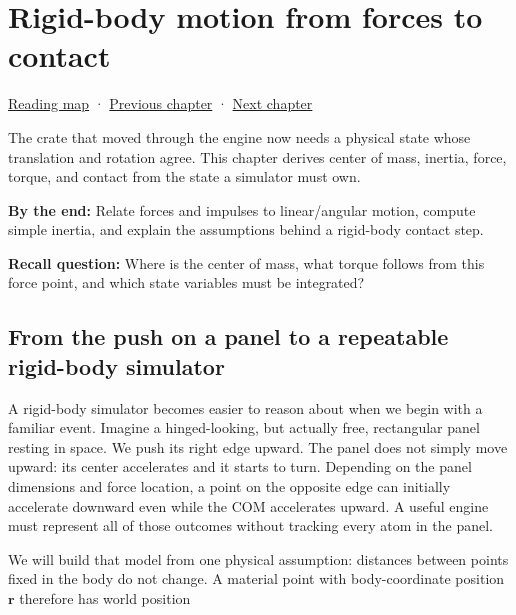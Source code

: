 \chapter{Rigid-body motion from forces to contact}\label{06-engine-ii-ch034-rigid-body-motion-from-forces-to-contact}\hypertarget{06-engine-ii-ch034}{}\label{stagechapter:06-engine-ii-ch034}

\hypertarget{06-engine-ii-ch034-rigid-body-motion-from-forces-to-contact}{}

\hyperref[volume-reading-map]{Reading map} · \hyperref[06-engine-ii-ch033-versioned-scenes-and-transactional-loading]{Previous chapter} · \hyperref[06-engine-ii-ch035-a-complete-rigid-body-state-before-the-formula-audit]{Next chapter}

The crate that moved through the engine now needs a physical state whose translation and rotation agree. This chapter derives center of mass, inertia, force, torque, and contact from the state a simulator must own.

\textbf{By the end:} Relate forces and impulses to linear/angular motion, compute simple inertia, and explain the assumptions behind a rigid-body contact step.

\textbf{Recall question:} Where is the center of mass, what torque follows from this force point, and which state variables must be integrated?

\section{From the push on a panel to a repeatable rigid-body simulator}\label{06-engine-ii-ch034-from-the-push-on-a-panel-to-a-repeatable-rigid-body-simulator}

\hypertarget{06-engine-ii-ch034-from-the-push-on-a-panel-to-a-repeatable-rigid-body-simulator}{}

A rigid-body simulator becomes easier to reason about when we begin with a familiar event. Imagine a hinged-looking, but actually free, rectangular panel resting in space. We push its right edge upward. The panel does not simply move upward: its center accelerates and it starts to turn. Depending on the panel dimensions and force location, a point on the opposite edge can initially accelerate downward even while the COM accelerates upward. A useful engine must represent all of those outcomes without tracking every atom in the panel.

We will build that model from one physical assumption: distances between points fixed in the body do not change. A material point with body-coordinate position \(\mathbf r\) therefore has world position

